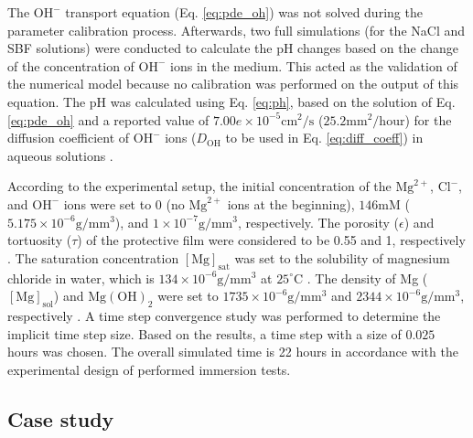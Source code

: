 The $\mathrm{OH}^{-}$ transport equation (Eq. \ref{eq:pde_oh}) was not solved during the parameter calibration process. Afterwards, two full simulations (for the NaCl and {SBF} solutions) were conducted to calculate the pH changes based on the change of the concentration of $\mathrm{OH}^{-}$ ions in the medium. This acted as the validation of the numerical model because no calibration was performed on the output of this equation. The pH was calculated using Eq. \ref{eq:ph}, based on the solution of Eq. \ref{eq:pde_oh} and a reported value of $7.00e\times10^{-5} \mathrm{cm}^2/\mathrm{s}$ ($25.2 \mathrm{mm}^2/\mathrm{hour}$) for the diffusion coefficient of $\mathrm{OH}^{-}$ ions ($D_{\mathrm{OH}}$ to be used in Eq. \ref{eq:diff_coeff}) in aqueous solutions \cite{Lee2011}.

According to the experimental setup, the initial concentration of the $\mathrm{Mg}^{2+}$, $\mathrm{Cl}^{-}$, and $\mathrm{OH}^{-}$ ions were set to 0 (no $\mathrm{Mg}^{2+}$ ions at the beginning), $146 \mathrm{mM}$ ($5.175\times10^{-6} \mathrm{g}/\mathrm{mm}^3$), and $1\times10^{-7} \mathrm{g}/\mathrm{mm}^3$, respectively. The porosity ($\epsilon$) and tortuosity ($\tau$) of the protective film were considered to be 0.55 and 1, respectively \cite{Sun2012}. The saturation concentration $[\mathrm{Mg}]_{\mathrm{sat}}$ was set to the solubility of magnesium chloride in water, which is $134\times10^{-6}\mathrm{g}/\mathrm{mm}^3$ at $25^{\circ}\mathrm{C}$ \cite{GrahamC.Hill2001}. The density of Mg ($[\mathrm{Mg}]_{\mathrm{sol}}$) and $\mathrm{Mg(OH)}_2$ were set to $1735\times10^{-6}\mathrm{g}/\mathrm{mm}^3$ and $2344\times10^{-6}\mathrm{g}/\mathrm{mm}^3$, respectively \cite{Bajger2016}. A time step convergence study was performed to determine the implicit time step size. Based on the results, a time step with a size of $0.025$ hours was chosen. The overall simulated time is 22 hours in accordance with the experimental design of performed immersion tests.

\subsection{Case study}

